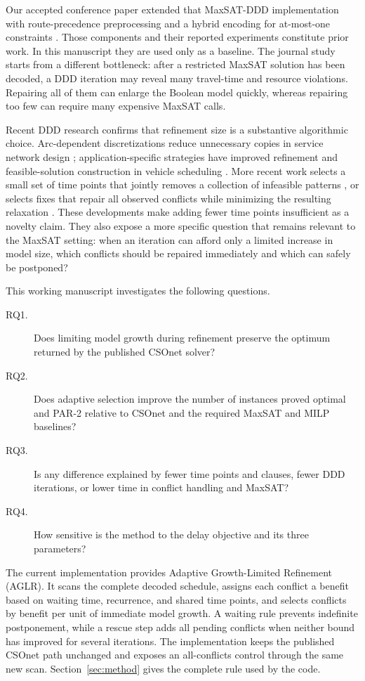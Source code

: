 \documentclass[preprint,12pt,authoryear]{elsarticle}
\begin{document}
Our accepted conference paper extended that MaxSAT-DDD implementation with
route-precedence preprocessing and a hybrid encoding for at-most-one
constraints \citep{KieuEtAl2026Conference}. Those components and their reported
experiments constitute prior work. In this manuscript they are used only as a
baseline. The journal study starts from a different bottleneck: after a
restricted MaxSAT solution has been decoded, a DDD iteration may reveal many
travel-time and resource violations. Repairing all of them can enlarge the
Boolean model quickly, whereas repairing too few can require many expensive
MaxSAT calls.

Recent DDD research confirms that refinement size is a substantive algorithmic
choice. Arc-dependent discretizations reduce unnecessary copies in service
network design \citep{VanDykKoenemann2024}; application-specific strategies
have improved refinement and feasible-solution construction in vehicle
scheduling \citep{VanLieshoutVanderSchaft2025}. More recent work selects a small
set of time points that jointly removes a collection of infeasible patterns
\citep{ShuXuBaldacci2026}, or selects fixes that repair all observed conflicts
while minimizing the resulting relaxation \citep{HelberEtAl2026}. These
developments make adding fewer time points insufficient as a novelty claim.
They also expose a more specific question that remains relevant to the MaxSAT
setting: when an iteration can afford only a limited increase in model size,
which conflicts should be repaired immediately and which can safely be
postponed?

This working manuscript investigates the following questions.

\begin{description}
\item[RQ1.] Does limiting model growth during refinement preserve the optimum
returned by the published CSOnet solver?
\item[RQ2.] Does adaptive selection improve the number of instances proved
optimal and PAR-2 relative to CSOnet and the required MaxSAT and MILP baselines?
\item[RQ3.] Is any difference explained by fewer time points and clauses,
fewer DDD iterations, or lower time in conflict handling and MaxSAT?
\item[RQ4.] How sensitive is the method to the delay objective and its three
parameters?
\end{description}

The current implementation provides Adaptive Growth-Limited Refinement (AGLR).
It scans the complete decoded schedule, assigns each conflict a benefit based
on waiting time, recurrence, and shared time points, and selects conflicts by
benefit per unit of immediate model growth. A waiting rule prevents indefinite
postponement, while a rescue step adds all pending conflicts when neither bound
has improved for several iterations. The implementation keeps the published
CSOnet path unchanged and exposes an all-conflicts control through the same new
scan. Section~\ref{sec:method} gives the complete rule used by the code.
\end{document}
